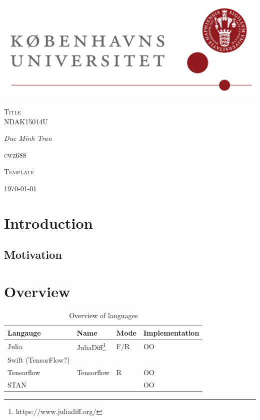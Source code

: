 

\author{Minh}

	\begin{titlepage}
		\centering
		\includegraphics[width=\textwidth]{KuLogo.png}
		\par\vspace{1cm}
		\vspace{1cm}
		{\scshape\Large Title \\
			NDAK15014U\par}
		\vspace{1.5cm}
		{\Large\itshape Duc Minh Tran }\\
		\vspace{0.5cm}
		{\scshape\large cwz688 \\ \par}
		\vfill
		{\Large\scshape Template \par}
		\vfill
		\par
		\vfill
		{\large \today\par}
	\end{titlepage}
	\newpage
	\section{Introduction}
	\subsection{Motivation}


  \section{Overview}
  \begin{table}[H]
    \centering
    \begin{tabular}{l|lll}
      \textbf{Langauge}  & Name & Mode & Implementation  \\ \hline
      Julia                & JuliaDiff\footnote{https://www.juliadiff.org/} &  F/R  & OO \\
      Swift (TensorFlow?)  & &     & \\
      Tensorflow           & Tensorflow   & R  & OO \\
      STAN                 &   &  & OO \\
    \end{tabular}
    \caption{Overview of languages}
    \label{tab:overview}
  \end{table}

